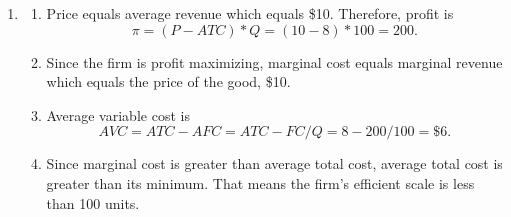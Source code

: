 \documentclass{article}
\begin{document}
\begin{enumerate}
\item

	\begin{enumerate}
	
	\item Price equals average revenue which equals \$10. Therefore, profit is \[\pi = (P - ATC)*Q = (10 - 8)*100 = 200.\]
	
	\item Since the firm is profit maximizing, marginal cost equals marginal revenue which equals the price of the good, \$10.
	
	\item Average variable cost is 
	\[ AVC = ATC - AFC = ATC - FC/Q = 8 - 200/100 = \$6.\]
	
	\item Since marginal cost is greater than average total cost, average total cost is greater than its minimum. That means the firm's efficient scale is less than 100 units.
	
	\end{enumerate}

\end{enumerate}
\end{document}
